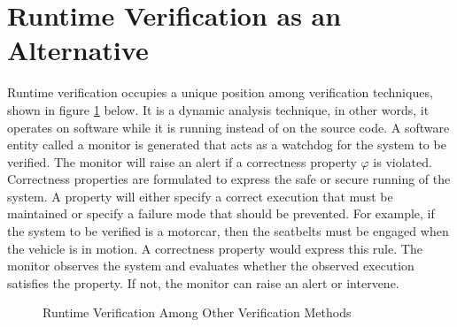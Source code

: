\section{Runtime Verification as an Alternative}


Runtime verification occupies a unique position among verification techniques, shown in figure \ref{fig:VerificationTechniqueTree} below.  It is a dynamic analysis technique, in other words, it operates on software while it is running instead of on the source code.  A software entity called a monitor is generated that acts as a watchdog for the system to be verified.  The monitor will raise an alert if a correctness property $\varphi$ is violated.  Correctness properties are formulated to express the safe or secure running of the system.  A property will either specify a correct execution that must be maintained or specify a failure mode that should be prevented.  For example, if the system to be verified is a motorcar, then the seatbelts must be engaged when the vehicle is in motion.  A correctness property would express this rule.  The monitor observes the system and evaluates whether the observed execution satisfies the property.  If not, the monitor can raise an alert or intervene.

\begin{figure}[h!]
	\caption{Runtime Verification Among Other Verification Methods}
	\label{fig:VerificationTechniqueTree}
\end{figure}

